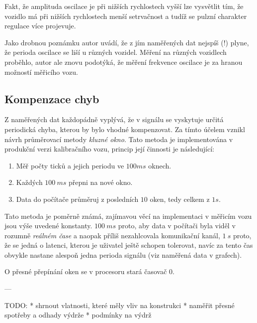 \begin{enumerate}
Fakt, že amplituda oscilace je při nižších rychlostech vyšší lze vysvětlit tím,
že vozidlo má při nižších rychlostech menší setrvačnost a tudíž se pulzní
charakter regulace více projevuje.

Jako drobnou poznámku autor uvádí, že z jím naměřených dat nejspíš (!) plyne,
že perioda oscilace se liší u různých vozidel. Měření na různých vozidlech
proběhlo, autor ale znovu podotýká, že měření frekvence oscilace je za hranou
možností měřicího vozu.

\subsection{Kompenzace chyb}

Z naměřených dat každopádně vyplývá, že v signálu se vyskytuje určitá
periodická chyba, kterou by bylo vhodné kompenzovat. Za tímto účelem vznikl
návrh průměrovací metody \textit{kluzné okno}. Tato metoda je implementována
v produkční verzi kalibračního vozu, princip její činnosti je následující:

\begin{enumerate}
\item Měř počty ticků a jejich periodu ve $100ms$ oknech.
\item Každých $100\ ms$ přepni na nové okno.
\item Data do počítače průměruj z posledních $10$ oken, tedy celkem z $1 s$.
\end{enumerate}

Tato metoda je poměrně známá, zajímavou věcí na implementaci v měřicím vozu
jsou výše uvedené konstanty. $100\ ms$ proto, aby data v počítači byla viděl
v rozumně \textit{reálném čase} a naopak příliš nezahlcovala komunikační kanál,
$1\ s$ proto, že se jedná o latenci, kterou je uživatel ještě schopen tolerovat,
navíc za tento čas obvykle nastane alespoň jedna perioda signálu (viz naměřená
data v grafech).

O přesné přepínání oken se v procesoru stará časovač 0.

\end{enumerate}

---

TODO:
 * shrnout vlatnosti, které měly vliv na konstrukci
 * naměřit přesné spotřeby a odhady výdrže
 * podmínky na výdrž
